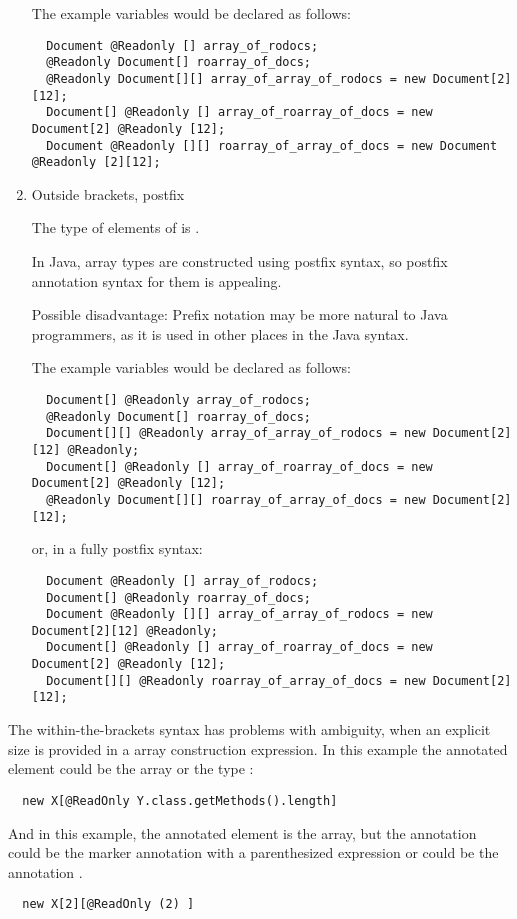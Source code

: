 \begin{enumerate}
The example variables would be declared as follows:

\begin{Verbatim}
  Document @Readonly [] array_of_rodocs;
  @Readonly Document[] roarray_of_docs;
  @Readonly Document[][] array_of_array_of_rodocs = new Document[2][12];
  Document[] @Readonly [] array_of_roarray_of_docs = new Document[2] @Readonly [12];
  Document @Readonly [][] roarray_of_array_of_docs = new Document @Readonly [2][12];
\end{Verbatim}

  \item{Outside brackets, postfix}

The type of elements of  is .

In Java, array types are constructed using postfix syntax, so postfix
annotation syntax for them is appealing.

Possible disadvantage:  Prefix notation may be more natural to Java
programmers, as it is used in other places in the Java syntax.

The example variables would be declared as follows:

\begin{Verbatim}
  Document[] @Readonly array_of_rodocs;
  @Readonly Document[] roarray_of_docs;
  Document[][] @Readonly array_of_array_of_rodocs = new Document[2][12] @Readonly;
  Document[] @Readonly [] array_of_roarray_of_docs = new Document[2] @Readonly [12];
  @Readonly Document[][] roarray_of_array_of_docs = new Document[2][12];
\end{Verbatim}

or, in a fully postfix syntax:

\begin{Verbatim}
  Document @Readonly [] array_of_rodocs;
  Document[] @Readonly roarray_of_docs;
  Document @Readonly [][] array_of_array_of_rodocs = new Document[2][12] @Readonly;
  Document[] @Readonly [] array_of_roarray_of_docs = new Document[2] @Readonly [12];
  Document[][] @Readonly roarray_of_array_of_docs = new Document[2][12];
\end{Verbatim}


\setcounter{saveenumi}{\theenumi}
\end{enumerate}

The within-the-brackets syntax has problems with ambiguity, when an
explicit size is provided in a  array construction expression.
In this example the annotated element could be the array or the type :
\begin{Verbatim}
  new X[@ReadOnly Y.class.getMethods().length]
\end{Verbatim}
And in this example, the annotated element is the array, but the annotation could
be the marker annotation  with a parenthesized expression  or
could be the annotation .
\begin{Verbatim}
  new X[2][@ReadOnly (2) ]
\end{Verbatim}


